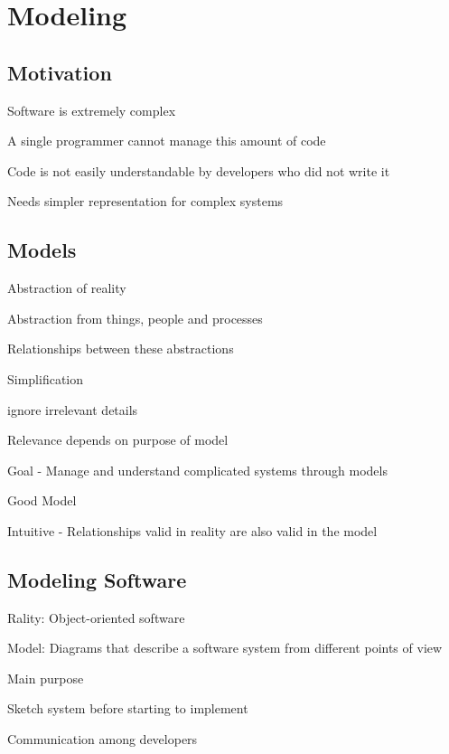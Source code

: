 \documentclass[10pt]{article}
\begin{document}
\section{Modeling}

\subsection{Motivation}
\enumstart
	\item Software is extremely complex
	\item A single programmer cannot manage this amount of code
	\item Code is not easily understandable by developers who did not write it
	\item Needs simpler representation for complex systems
\enumend

\subsection{Models}
\enumstart
	\item Abstraction of reality
	\item Abstraction from things, people and processes
	\item Relationships between these abstractions
	\item Simplification
	\enumstart
		\item ignore irrelevant details
		\item Relevance depends on purpose of model
	\enumend
	\item Goal - Manage and understand complicated systems through models
	\item Good Model
	\enumstart
		\item Intuitive - Relationships valid in reality are also valid in the model
	\enumend
\enumend

\subsection{Modeling Software}
\enumstart
\item Rality: Object-oriented software
\item Model: Diagrams that describe a software system from different points of view
\item Main purpose
\enumstart
	\item Sketch system before starting to implement
	\item Communication among developers
\enumend
\enumend
\end{document}

